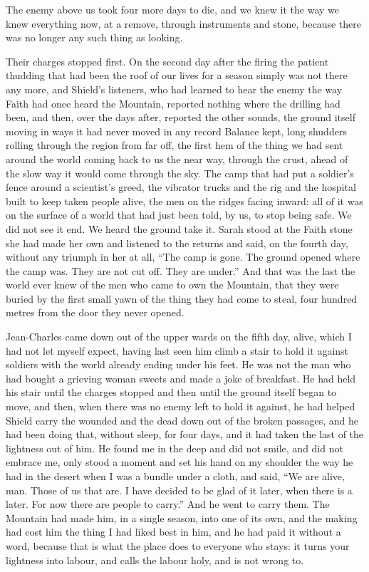 
The enemy above us took four more days to die, and we knew it the way we knew everything now, at a remove, through instruments and stone, because there was no longer any such thing as looking.\par

Their charges stopped first. On the second day after the firing the patient thudding that had been the roof of our lives for a season simply was not there any more, and Shield's listeners, who had learned to hear the enemy the way Faith had once heard the Mountain, reported nothing where the drilling had been, and then, over the days after, reported the other sounds, the ground itself moving in ways it had never moved in any record Balance kept, long shudders rolling through the region from far off, the first hem of the thing we had sent around the world coming back to us the near way, through the crust, ahead of the slow way it would come through the sky. The camp that had put a soldier's fence around a scientist's greed, the vibrator trucks and the rig and the hospital built to keep taken people alive, the men on the ridges facing inward: all of it was on the surface of a world that had just been told, by us, to stop being safe. We did not see it end. We heard the ground take it. Sarah stood at the Faith stone she had made her own and listened to the returns and said, on the fourth day, without any triumph in her at all, ``The camp is gone. The ground opened where the camp was. They are not cut off. They are under.'' And that was the last the world ever knew of the men who came to own the Mountain, that they were buried by the first small yawn of the thing they had come to steal, four hundred metres from the door they never opened.\par

Jean-Charles came down out of the upper wards on the fifth day, alive, which I had not let myself expect, having last seen him climb a stair to hold it against soldiers with the world already ending under his feet. He was not the man who had bought a grieving woman sweets and made a joke of breakfast. He had held his stair until the charges stopped and then until the ground itself began to move, and then, when there was no enemy left to hold it against, he had helped Shield carry the wounded and the dead down out of the broken passages, and he had been doing that, without sleep, for four days, and it had taken the last of the lightness out of him. He found me in the deep and did not smile, and did not embrace me, only stood a moment and set his hand on my shoulder the way he had in the desert when I was a bundle under a cloth, and said, ``We are alive, man. Those of us that are. I have decided to be glad of it later, when there is a later. For now there are people to carry.'' And he went to carry them. The Mountain had made him, in a single season, into one of its own, and the making had cost him the thing I had liked best in him, and he had paid it without a word, because that is what the place does to everyone who stays: it turns your lightness into labour, and calls the labour holy, and is not wrong to.\par


